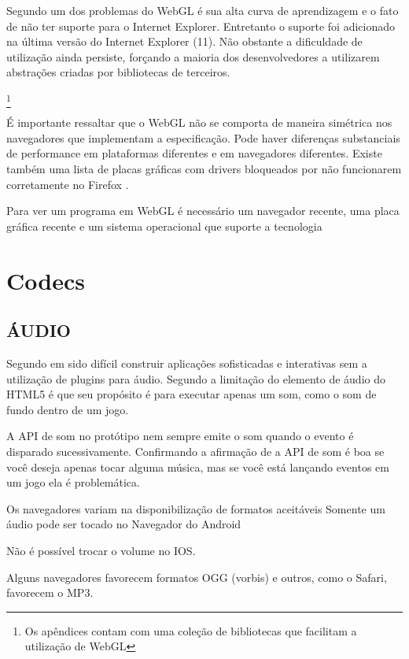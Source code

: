\begin{draft}
Segundo \cite{html5mostwanted} um dos problemas do WebGL é sua alta
curva de aprendizagem e o fato de não ter suporte para o Internet
Explorer. Entretanto o suporte foi adicionado na última versão do
Internet Explorer (11). Não obstante a dificuldade de utilização
ainda persiste, forçando a maioria dos desenvolvedores a utilizarem
abstrações criadas por bibliotecas de terceiros.

\footnote{Os apêndices contam com uma coleção de bibliotecas que facilitam a utilização de WebGL}

É importante ressaltar que o WebGL não se comporta de maneira
simétrica nos navegadores que implementam a especificação. Pode haver
diferenças substanciais de performance em plataformas diferentes e em
navegadores diferentes. Existe também uma lista de placas gráficas
com drivers bloqueados por não funcionarem corretamente no Firefox
\autocite[pp.42]{3daps}.

Para ver um programa em WebGL é necessário um navegador recente, uma
placa gráfica recente e um sistema operacional que suporte a tecnologia
\autocite{html5mostwanted}

\section{Codecs}

\subsection{ÁUDIO}

Segundo \cite{browserGamesTechnologyAndFuture} em sido difícil
construir aplicações sofisticadas e interativas sem a utilização de
plugins para áudio.
Segundo \cite{html5mostwanted} a limitação do elemento de áudio do
HTML5 é que seu propósito é para executar apenas um som, como o som
de fundo dentro de um jogo.

A API de som no protótipo nem sempre emite o som quando o
evento é disparado sucessivamente. Confirmando a afirmação de
\cite{html5mostwanted} a API de som é boa se você deseja apenas tocar
alguma música, mas se você está lançando eventos em um jogo ela é
problemática.

Os navegadores variam na disponibilização de formatos aceitáveis
Somente um áudio pode ser tocado no Navegador do Android

Não é possível trocar o volume no IOS.

Alguns navegadores favorecem formatos OGG (vorbis) e outros, como o
Safari, favorecem o MP3.


\end{draft}

